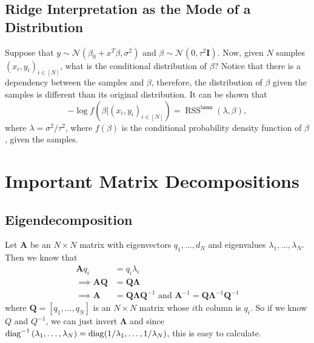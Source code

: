 \documentclass[11pt]{article}
\theoremstyle{definition}
\renewcommand{\AA}{\mathbf{A}}
\newcommand{\QQ}{\mathbf{Q}}
\newcommand{\LL}{\mathbf{\Lambda}}
\newcommand{\II}{\mathbf{I}}
\newcommand{\lasso}{\textsf{lasso}}
\newcommand{\Normal}[2]{\ensuremath{\mathcal N (#1, #2)}}
\DeclareMathOperator*{\RSS}{RSS} \DeclareMathOperator*{\WRSS}{WRSS}
\begin{document}
\subsection{Ridge Interpretation as the Mode of a Distribution}
Suppose that $y\sim \Normal{\beta_0+x^T\beta}{\sigma^2}$ and
$\beta\sim\Normal{0}{\tau^2 \II}$. Now, given $N$ samples $(x_i,y_i)_{i\in[N]}$,
what is the conditional distribution of $\beta$? Notice that there is a
dependency between the samples and $\beta$, therefore, the distribution of
$\beta$ given the samples is different than its original distribution. It can be
shown that
\[-\log f(\beta|(x_i,y_i)_{i\in[N]})=\RSS^\lasso(\lambda,\beta),\] where
$\lambda=\sigma^2/\tau^2$, where $f(\beta)$ is the conditional probability
density function of $\beta$, given the samples.


\section{Important Matrix Decompositions}

\subsection{Eigendecomposition}
Let $\AA$ be an $N\times N$ matrix with eigenvectors $q_1,\ldots,d_N$ and
eigenvalues $\lambda_1,\ldots,\lambda_N$. Then we know that
\begin{equation}
	\begin{split}
		\AA q_i &=  q_i\lambda_i \\
		\implies\AA\QQ &= \QQ\LL \\
		\implies\AA &= \QQ\LL\QQ^{-1}\text{ and }\AA^{-1}=\QQ\LL^{-1}\QQ^{-1}
	\end{split}
\end{equation}
where $\QQ=[q_1,\ldots,q_N]$ is an $N\times N$ matrix whose $i$th column is
$q_i$. So if we know $Q$ and $Q^{-1}$, we can just invert $\LL$ and since
$\operatorname*{diag}^{-1}{(\lambda_1,\ldots,\lambda_N)}=\operatorname*{diag}(1/\lambda_1,\ldots,1/\lambda_N)$,
this is easy to calculate.
\end{document}
